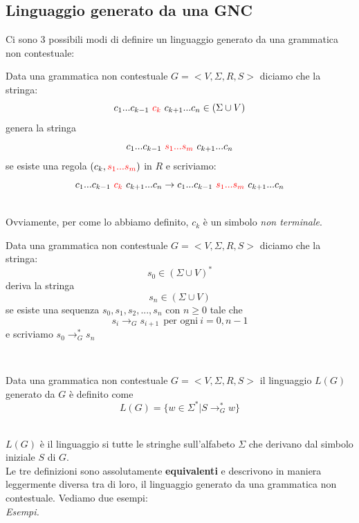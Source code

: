 \subsection{Linguaggio generato da una GNC}
Ci sono 3 possibili modi di definire un linguaggio generato da una grammatica non contestuale:\smallskip\\
\colorbox{SALZO}{\parbox{\dimexpr\linewidth-2\fboxsep}{\begin{definition}
   Data una grammatica non contestuale $G = <V, \Sigma,R,S>$ diciamo che la stringa:
   \[    c_1...c_{k-1}  \ \mathcolor{red}{c_k}\ c_{k+1}...c_n \in (\Sigma \cup V) \]
   genera la stringa 
   \[    c_1...c_{k-1}  \ \mathcolor{red}{s_1...s_m}\ c_{k+1}...c_n \]
   se esiste una regola $(c_k,\mathcolor{red}{s_1...s_m})$ in $R$ e scriviamo:
   \[  c_1...c_{k-1}  \ \mathcolor{red}{c_k}\ c_{k+1}...c_n  \rightarrow   c_1...c_{k-1}  \ \mathcolor{red}{s_1...s_m}\ c_{k+1}...c_n \]
\end{definition}}}\smallskip\\
Ovviamente, per come lo abbiamo definito, $c_k$ è un simbolo \textit{non terminale}.\medskip\\
\colorbox{SALZO}{\parbox{\dimexpr\linewidth-2\fboxsep}{\begin{definition}
   Data una grammatica non contestuale $G = <V, \Sigma,R,S>$ diciamo che la stringa:
 \[     s_0 \in (\Sigma \cup V)^*   \]
 deriva la stringa
 \[    s_n \in (\Sigma \cup V)     \]
 se esiste una sequenza $s_0,s_1,s_2,...,s_n$ con $n\ge 0$ tale che
 \[   s_i \rightarrow_G s_{i+1}  \ \ \text{per ogni}\ i = 0,n-1\]
 e scriviamo
 $s_0 \rightarrow^*_G s_n $
\end{definition}}}\medskip\\
\colorbox{SALZO}{\parbox{\dimexpr\linewidth-2\fboxsep}{\begin{definition}
   Data una grammatica non contestuale $G = <V, \Sigma,R,S>$ il linguaggio $L(G)$ generato da $G$ è definito come
   \[  L(G) = \{ w \in \Sigma^* | S \rightarrow^*_G w    \}   \]
\end{definition}}}\smallskip\\
$L(G)$ è il linguaggio si tutte le stringhe sull'alfabeto $\Sigma$ che derivano dal simbolo iniziale $S$ di $G$.\smallskip\\
Le tre definizioni sono assolutamente \textbf{equivalenti} e descrivono in maniera leggermente diversa tra di loro, il linguaggio generato 
da una grammatica non contestuale. Vediamo due esempi:\smallskip\\
\textit{Esempi.}
